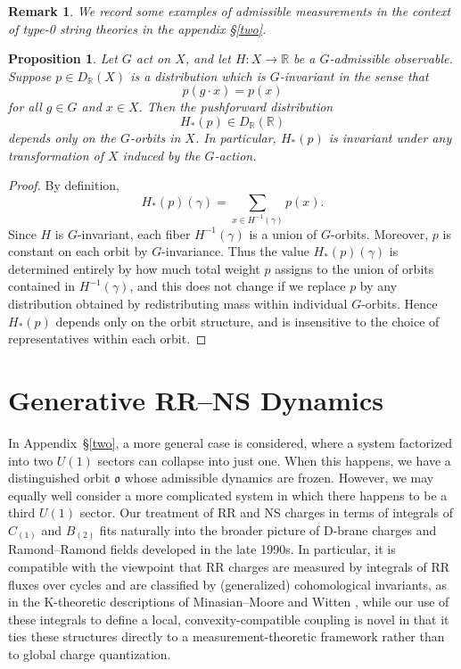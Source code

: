 \documentclass{article}
\newtheorem{rk}{Remark}
\newtheorem{pp}{Proposition}
\numberwithin{tm}{section}
\numberwithin{dn}{section}
\numberwithin{as}{section}
\numberwithin{rk}{section}
\numberwithin{lem}{section}
\numberwithin{ax}{section}
\numberwithin{pp}{section}
\numberwithin{eg}{section}
\numberwithin{war}{section}
\numberwithin{equation}{section}
\numberwithin{prop}{section}
\numberwithin{nt}{section}
\numberwithin{rc}{section}
\numberwithin{setup}{section}
\begin{document}
\begin{rk}
	We record some examples of admissible measurements in the context of type-0 string theories in the appendix \S\ref{two}.
\end{rk}

\begin{pp} \label{pp}
	Let $G$ act on $X$, and let $H : X \to \mathbb{R}$ be a $G$-admissible observable. Suppose $p \in D_{\mathbb{R}}(X)$ is a distribution which is $G$-invariant in the sense that
	\[
	p(g\cdot x) = p(x)
	\]
	for all $g \in G$ and $x \in X$. Then the pushforward distribution
	\[
	H_* (p) \in D_{\mathbb{R}}(\mathbb{R})
	\]
	depends only on the $G$-orbits in $X$. In particular, $H_*(p)$ is invariant under any transformation of $X$ induced by the $G$-action.
\end{pp}

\begin{proof}
	By definition,
	\[
	H_*(p)(\gamma) = \sum_{x \in H^{-1}(\gamma)} p(x).
	\]
	Since $H$ is $G$-invariant, each fiber $H^{-1}(\gamma)$ is a union of $G$-orbits. Moreover, $p$ is constant on each orbit by $G$-invariance. Thus the value $H_*(p)(\gamma)$ is determined entirely by how much total weight $p$ assigns to the union of orbits contained in $H^{-1}(\gamma)$, and this does not change if we replace $p$ by any distribution obtained by redistributing mass within individual $G$-orbits. Hence $H_*(p)$ depends only on the orbit structure, and is insensitive to the choice of representatives within each orbit.
\end{proof}

\section{Generative RR--NS Dynamics} \label{RRNS}

In Appendix~\S\ref{two}, a more general case is considered, where a system factorized into two $U(1)$ sectors can collapse into just one. When this happens, we have a distinguished orbit $\mathfrak{o}$ whose admissible dynamics are frozen. However, we may equally well consider a more complicated system in which there happens to be a third $U(1)$ sector. Our treatment of RR and NS charges in terms of integrals of $C_{(1)}$ and $B_{(2)}$ fits naturally into the broader picture of D-brane charges and Ramond--Ramond fields developed in the late 1990s. In particular, it is compatible with the viewpoint that RR charges are measured by integrals of RR fluxes over cycles and are classified by (generalized) cohomological invariants, as in the K-theoretic descriptions of Minasian--Moore \cite{MinasianMoore} and Witten \cite{WittenKtheory}, while our use of these integrals to define a local, convexity-compatible coupling is novel in that it ties these structures directly to a measurement-theoretic framework rather than to global charge quantization.
\end{document}
